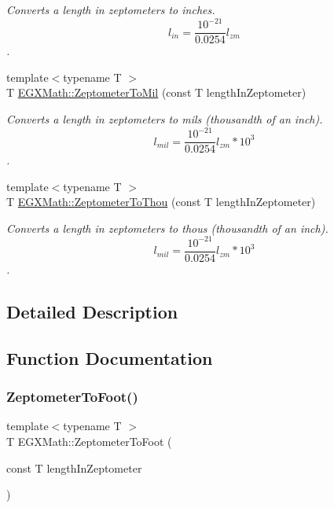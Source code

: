 \begin{DoxyCompactItemize}
\begin{DoxyCompactList}\small\item\em Converts a length in zeptometers to inches. \[ l_{in}= \frac{10^{-21}}{0.0254} l_{zm} \]. \end{DoxyCompactList}\item 
{\footnotesize template$<$typename T $>$ }\\T \mbox{\hyperlink{group___e_g_x_math-_conversions-_length_conversions-_s_i-_zeptometer-_imperial_ga68abfac4247069bdffc24002b0636495}{E\+G\+X\+Math\+::\+Zeptometer\+To\+Mil}} (const T length\+In\+Zeptometer)
\begin{DoxyCompactList}\small\item\em Converts a length in zeptometers to mils (thousandth of an inch). \[ l_{mil}= \frac{10^{-21}}{0.0254} l_{zm} * 10^{3} \]. \end{DoxyCompactList}\item 
{\footnotesize template$<$typename T $>$ }\\T \mbox{\hyperlink{group___e_g_x_math-_conversions-_length_conversions-_s_i-_zeptometer-_imperial_ga14432ed712e073dcae040496f83464b6}{E\+G\+X\+Math\+::\+Zeptometer\+To\+Thou}} (const T length\+In\+Zeptometer)
\begin{DoxyCompactList}\small\item\em Converts a length in zeptometers to thous (thousandth of an inch). \[ l_{mil}= \frac{10^{-21}}{0.0254} l_{zm} * 10^{3} \]. \end{DoxyCompactList}\end{DoxyCompactItemize}


\subsection{Detailed Description}


\subsection{Function Documentation}
\mbox{\label{group___e_g_x_math-_conversions-_length_conversions-_s_i-_zeptometer-_imperial_ga2567dcbdc1b08aa9c9e99082ad9fe92b}} 
\subsubsection{\texorpdfstring{Zeptometer\+To\+Foot()}{ZeptometerToFoot()}}
{\footnotesize\ttfamily template$<$typename T $>$ \\
T E\+G\+X\+Math\+::\+Zeptometer\+To\+Foot (\begin{DoxyParamCaption}\item[{const T}]{length\+In\+Zeptometer }\end{DoxyParamCaption})}



